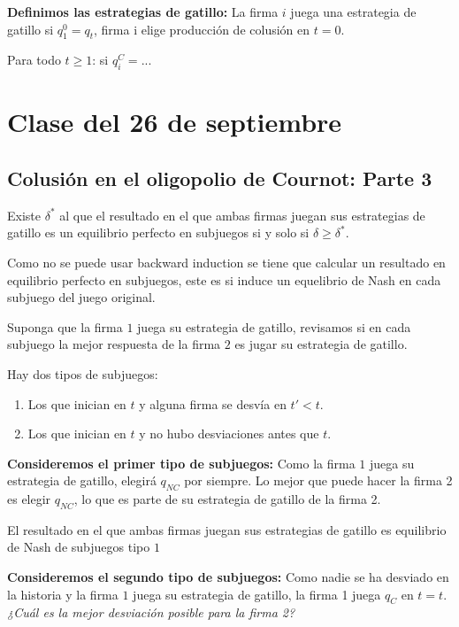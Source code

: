 \documentclass[letterpaper,12pt,twocolumn]{report}
\begin{document}
\textbf{Definimos las estrategias de gatillo:} La firma $i$ juega una estrategia de gatillo si $q_1^{0}=q_t$, firma i elige producción de colusión en $t=0$.

Para todo $t\geq1$: si $q_i^C=...$

\section{Clase del 26 de septiembre}

\subsection*{Colusión en el oligopolio de Cournot: Parte 3}

\begin{tcolorbox}[title=  Proposición]
	Existe $\delta^*$ al que el resultado en el que ambas firmas juegan sus estrategias de gatillo es un equilibrio perfecto en subjuegos si y solo si $\delta \geq \delta^*$.
\end{tcolorbox}

Como no se puede usar backward induction se tiene que calcular un resultado en equilibrio perfecto en subjuegos, este es si induce un equelibrio de Nash en cada subjuego del juego original.

Suponga que la firma $1$ juega su estrategia de gatillo, revisamos si en cada subjuego la mejor respuesta de la firma $2$ es jugar su estrategia de gatillo.

Hay dos tipos de subjuegos: 

\begin{enumerate}
	\item Los que inician en $t$ y alguna firma se desvía en $t'<t$.
	\item Los que inician en $t$ y no hubo desviaciones antes que $t$.
\end{enumerate}

\textbf{Consideremos el primer tipo de subjuegos:} Como la firma $1$ juega su estrategia de gatillo, elegirá $q_{NC}$ por siempre. Lo mejor que puede hacer la firma 2 es elegir $q_{NC}$, lo que es parte de su estrategia de gatillo de la firma 2.

El resultado en el que ambas firmas juegan sus estrategias de gatillo es equilibrio de Nash de subjuegos tipo $1$

\textbf{Consideremos el segundo tipo de subjuegos:} Como nadie se ha desviado en la historia y la firma $1$ juega su estrategia de gatillo, la firma 1 juega $q_C$ en $t=t$. \textit{¿Cuál es la mejor desviación posible para la firma 2?} 
\end{document}

